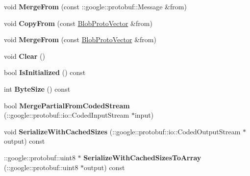 \begin{DoxyCompactItemize}
void {\bfseries Merge\+From} (const \+::google\+::protobuf\+::\+Message \&from)
\item 
\mbox{\label{classcaffe_1_1_blob_proto_vector_a4ea3ec65507f51580d1e655c8bb95bde}} 
void {\bfseries Copy\+From} (const \mbox{\hyperlink{classcaffe_1_1_blob_proto_vector}{Blob\+Proto\+Vector}} \&from)
\item 
\mbox{\label{classcaffe_1_1_blob_proto_vector_a367f54426e361e46dd593c34ad118800}} 
void {\bfseries Merge\+From} (const \mbox{\hyperlink{classcaffe_1_1_blob_proto_vector}{Blob\+Proto\+Vector}} \&from)
\item 
\mbox{\label{classcaffe_1_1_blob_proto_vector_a1b733bd689e570b5e45d4851971229aa}} 
void {\bfseries Clear} ()
\item 
\mbox{\label{classcaffe_1_1_blob_proto_vector_af26ae93fafd1e0d84708031b8a99a7da}} 
bool {\bfseries Is\+Initialized} () const
\item 
\mbox{\label{classcaffe_1_1_blob_proto_vector_ab2749716c3996c50147080f456be7b9d}} 
int {\bfseries Byte\+Size} () const
\item 
\mbox{\label{classcaffe_1_1_blob_proto_vector_a454119e39c3889744ca634852de8045b}} 
bool {\bfseries Merge\+Partial\+From\+Coded\+Stream} (\+::google\+::protobuf\+::io\+::\+Coded\+Input\+Stream $\ast$input)
\item 
\mbox{\label{classcaffe_1_1_blob_proto_vector_ad2e5f8a6870b2eecaab19959a39c71ff}} 
void {\bfseries Serialize\+With\+Cached\+Sizes} (\+::google\+::protobuf\+::io\+::\+Coded\+Output\+Stream $\ast$output) const
\item 
\mbox{\label{classcaffe_1_1_blob_proto_vector_a3b7543327e62a3a49dc788356c34edbc}} 
\+::google\+::protobuf\+::uint8 $\ast$ {\bfseries Serialize\+With\+Cached\+Sizes\+To\+Array} (\+::google\+::protobuf\+::uint8 $\ast$output) const
\item 
\mbox{\label{classcaffe_1_1_blob_proto_vector_ada245fc65f0bd8ad30237885f7b733d1}} 

\end{DoxyCompactItemize}
